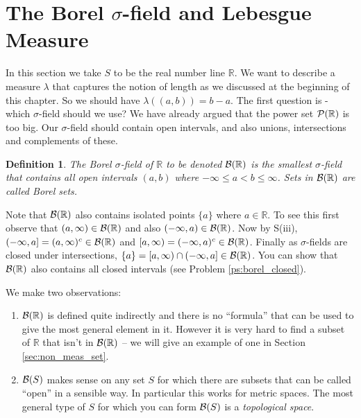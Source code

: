 \documentclass[a4paper]{report}
\newcounter{thm_counter}[chapter]
\newtheorem{defn}[thm_counter]{Definition}
\numberwithin{equation}{chapter}
\numberwithin{thm_counter}{section}
\def\mb{\mathbb} %
\def\R{\mb{R}} %
\begin{document}
\newpage
\section{The Borel $\sigma$-field and Lebesgue Measure}
\label{sec:borel_field_leb_meas}

In this section we take $S$ to be the real number line $\R$. We want to describe a measure $\lambda$ that captures the notion of length as we discussed at the beginning of this chapter. So we should have $\lambda((a,b)) = b-a$. The first question is - which $\sigma$-field should we use? We have already argued that the power set ${\cal P}(\R)$ is too big. Our $\sigma$-field should contain open intervals, and also unions, intersections and complements of these.

 

\begin{defn}
 The {\it Borel $\sigma$-field} of $\R$ to be denoted ${\cal B}(\R)$ is the smallest $\sigma$-field that contains all open intervals $(a, b)$ where $-\infty \leq a < b \leq \infty$. Sets in ${\cal B}(\R)$ are called {\it Borel sets}.
\end{defn}

 

Note that ${\cal B}(\R)$ also contains isolated points $\{a\}$ where $a \in \R$. To see this first observe that $(a, \infty) \in {\cal B}(\R)$ and also $(-\infty, a) \in {\cal B}(\R)$. Now by S(iii),$(-\infty, a] = (a, \infty)^{c} \in {\cal B}(\R)$ and  $[a, \infty) = (-\infty, a)^{c} \in {\cal B}(\R)$. Finally as $\sigma$-fields are closed under intersections, $\{a\} = [a, \infty) \cap (-\infty, a] \in {\cal B}(\R)$. You can show that ${\cal B}(\R)$ also contains all closed intervals (see Problem \ref{ps:borel_closed}).

 

We make two observations:
\begin{enumerate} \item ${\cal B}(\R)$ is defined quite indirectly and there is no ``formula'' that can be used to give the most general element in it. However it is very hard to find a subset of $\R$  that isn't in ${\cal B}(\R)$ -- we will give an example of one in Section \ref{sec:non_meas_set}.

\item ${\cal B}(S)$ makes sense on any set $S$ for which there are subsets that can be called ``open'' in a sensible way. In particular this works for metric spaces. The most general type of $S$ for which you can form ${\cal B}(S)$ is a {\it topological space}.

\end{enumerate}
\end{document}
